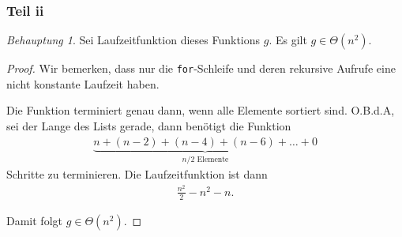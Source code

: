 \documentclass[a5paper]{article}
\theoremstyle{remark}
\newtheorem*{Behauptung}{Behauptung}
\begin{document}
\subsubsection{Teil ii}
\begin{Behauptung}
  Sei Laufzeitfunktion dieses Funktions \(g\).  Es gilt \(g \in \Theta(n^2)\).
\end{Behauptung}
\begin{proof}
    Wir bemerken, dass nur die \texttt{for}-Schleife und deren rekursive
  Aufrufe eine nicht konstante Laufzeit haben.

  Die Funktion terminiert genau dann, wenn alle Elemente sortiert
  sind. O.B.d.A, sei der Lange des Lists gerade, dann benötigt die
  Funktion
\begin{align*}
\underbrace{n + (n - 2) + (n - 4) + (n - 6) + \ldots + 0}_{n/2\text{ Elemente}}
\end{align*}
Schritte zu terminieren.  Die Laufzeitfunktion ist dann
\begin{align*}
\frac{n^2}{2}-n^2-n.
\end{align*}

Damit folgt  \(g \in \Theta(n^2)\).
\end{proof}
\end{document}
